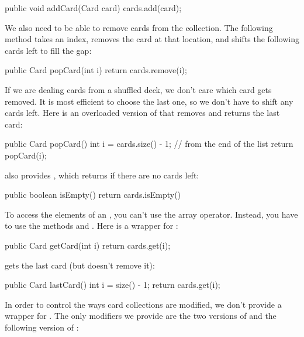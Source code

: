 \begin{code}
public void addCard(Card card) {
    cards.add(card);
}
\end{code}

We also need to be able to remove cards from the collection.
The following method takes an index, removes the card at that location, and shifts the following cards left to fill the gap:

\begin{code}
public Card popCard(int i) {
    return cards.remove(i);
}
\end{code}


If we are dealing cards from a shuffled deck, we don't care which card gets removed.
It is most efficient to choose the last one, so we don't have to shift any cards left.
Here is an overloaded version of  that removes and returns the last card:

\begin{code}
public Card popCard() {
    int i = cards.size() - 1;    // from the end of the list
    return popCard(i);
}
\end{code}


 also provides , which returns  if there are no cards left:

\begin{code}
public boolean isEmpty() {
    return cards.isEmpty()
}
\end{code}

To access the elements of an , you can't use the array \java{[]} operator.
Instead, you have to use the methods  and .
Here is a wrapper for :

\begin{code}
public Card getCard(int i) {
    return cards.get(i);
}
\end{code}

 gets the last card (but doesn't remove it):

\begin{code}
public Card lastCard() {
    int i = size() - 1;
    return cards.get(i);
}
\end{code}


In order to control the ways card collections are modified, we don't provide a wrapper for .
The only modifiers we provide are the two versions of  and the following version of :

